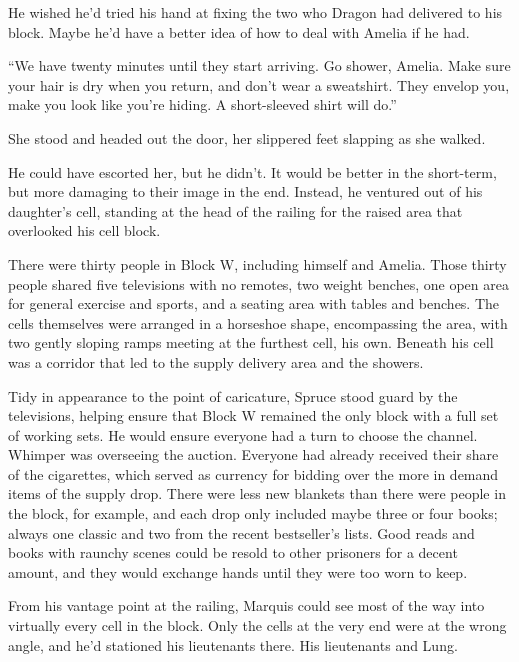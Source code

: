 He wished he'd tried his hand at fixing the two who Dragon had delivered to his block.  Maybe he'd have a better idea of how to deal with Amelia if he had.



``We have twenty minutes until they start arriving.  Go shower, Amelia.  Make sure your hair is dry when you return, and don't wear a sweatshirt.  They envelop you, make you look like you're hiding.  A short-sleeved shirt will do.''



She stood and headed out the door, her slippered feet slapping as she walked.



He could have escorted her, but he didn't.  It would be better in the short-term, but more damaging to their image in the end. Instead, he ventured out of his daughter's cell, standing at the head of the railing for the raised area that overlooked his cell block.



There were thirty people in Block W, including himself and Amelia.  Those thirty people shared five televisions with no remotes, two weight benches, one open area for general exercise and sports, and a seating area with tables and benches.  The cells themselves were arranged in a horseshoe shape, encompassing the area, with two gently sloping ramps meeting at the furthest cell, his own.  Beneath his cell was a corridor that led to the supply delivery area and the showers.



Tidy in appearance to the point of caricature, Spruce stood guard by the televisions, helping ensure that Block W remained the only block with a full set of working sets.  He would ensure everyone had a turn to choose the channel.  Whimper was overseeing the auction.  Everyone had already received their share of the cigarettes, which served as currency for bidding over the more in demand items of the supply drop.  There were less new blankets than there were people in the block, for example, and each drop only included maybe three or four books; always one classic and two from the recent bestseller's lists.  Good reads and books with raunchy scenes could be resold to other prisoners for a decent amount, and they would exchange hands until they were too worn to keep.



From his vantage point at the railing, Marquis could see most of the way into virtually every cell in the block.  Only the cells at the very end were at the wrong angle, and he'd stationed his lieutenants there.  His lieutenants and Lung.



